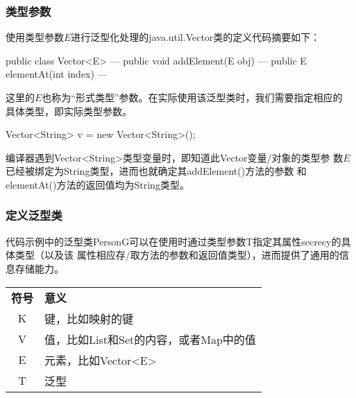 \begin{frame}[fragile] %
  \frametitle{类型参数}

  使用类型参数$E$进行泛型化处理的java.util.Vector类的定义代码摘要如下：
  
  \begin{javaCode}
    public class Vector<E> --- {
      public void addElement(E obj) { --- }
      public E elementAt(int index) { --- }
    }  
  \end{javaCode}

  \pause
  这里的$E$也称为“形式类型”参数。在实际使用该泛型类时，我们需要指定相应的
  具体类型，即实际类型参数。
  
  \begin{javaCode}
    Vector<String> v = new Vector<String>();  
  \end{javaCode}

  \pause
  编译器遇到Vector<String>类型变量时，即知道此Vector变量/对象的类型参
  数$E$已经被绑定为String类型，进而也就确定其addElement()方法的参数
  和elementAt()方法的返回值均为String类型。
\end{frame}




\begin{frame}[fragile] %
  \frametitle{定义泛型类}


  {\kai 代码示例中的泛型类PersonG可以在使用时通过类型参数T指定其属性secrecy的具体类型（以及该
    属性相应存/取方法的参数和返回值类型），进而提供了通用的信息存储能力。}

  \pause


  \begin{table}
    \footnotesize
    \setlength{\extrarowheight}{1.2mm}
    \begin{tabular}{c|p{6cm}}
      {\bf 符号} & {\bf 意义}  \\
      K & 键，比如映射的键\\
      V & 值，比如List和Set的内容，或者Map中的值\\
      E & 元素，比如Vector<E>\\
      T & 泛型\\
    \end{tabular}
  \end{table}
\end{frame}


